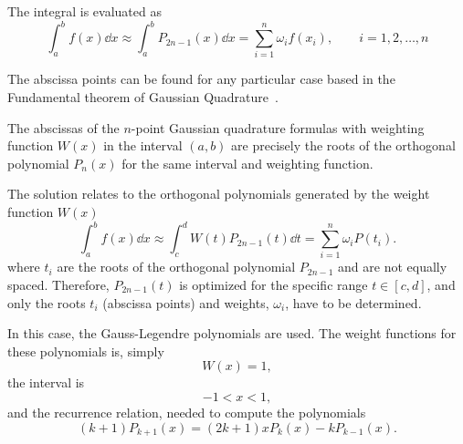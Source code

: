 The integral is evaluated as 
\begin{equation}
    \int_a^b f\left( x \right) \dd{x} \approx
    \int_a^b P_{2n-1} \left( x \right) \dd{x} =
    \sum_{i = 1}^{n} \omega_i f\left( x_i \right),
    \qquad i = 1,2,\ldots,n
\end{equation}

The abscissa points can be found for any particular case based in the Fundamental
theorem of Gaussian Quadrature~\cite{press1986numerical}.
\begin{theorem}
The abscissas of the $n$-point Gaussian quadrature formulas
with weighting function $W\left( x \right)$ in the interval $\left( a,b \right)$ are precisely the roots
of the orthogonal polynomial $P_n \left( x \right)$ for the same interval and weighting function.
\end{theorem}

The solution relates to the orthogonal polynomials generated by the weight 
function $W\left( x \right)$ 
\begin{equation}
    \int_a^b f\left( x \right) \dd{x} \approx
    \int_c^d W\left( t \right) P_{2n - 1} \left( t \right) \dd{t} =
    \sum_{i = 1}^{n} \omega_i P\left( t_i \right).
\end{equation}
where $t_i$ are the roots of the orthogonal polynomial $P_{2n-1}$ and are not
equally spaced. Therefore, $P_{2n-1} \left( t \right)$ is optimized for the 
specific range $t \in \left[ c, d \right]$, and only the roots $t_i$ (abscissa
points) and weights, $\omega_i$, have to be determined.

In this case, the Gauss-Legendre polynomials are used. The weight functions
for these polynomials is, simply 
\begin{equation}
    W\left( x \right) = 1,
\end{equation}
the interval is 
\begin{equation}
    -1 < x < 1,
\end{equation}
and the recurrence relation, needed to compute the polynomials 
\begin{equation}
    \left( k + 1 \right) P_{k + 1} \left( x \right) =
    \left( 2k + 1 \right) x P_k \left( x \right) - k P_{k - 1} \left( x \right).
\end{equation}

